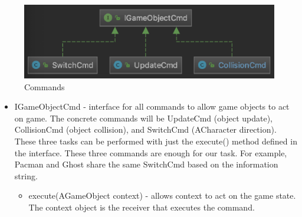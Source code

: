\documentclass[letterpaper, 11pt]{article}
\begin{document}
\begin{figure}[htbp] 
  \centering
  \includegraphics[width=.85\linewidth]{cmd.png} 
  \caption{Commands}
  \label{figcmd} 
\end{figure}

\begin{itemize}
  \item IGameObjectCmd - interface for all commands to allow game objects to act on game. The concrete commands will be UpdateCmd (object update), CollisionCmd (object collision), and SwitchCmd (ACharacter direction). These three tasks can be performed with just the execute() method defined in the interface. These three commands are enough for our task. For example, Pacman and Ghost share the same SwitchCmd based on the information string.
  \begin{itemize}
    \item execute(AGameObject context) - allows context to act on the game state. The context object is the receiver that executes the command.
  \end{itemize}
  

  
\end{itemize}
\end{document}
